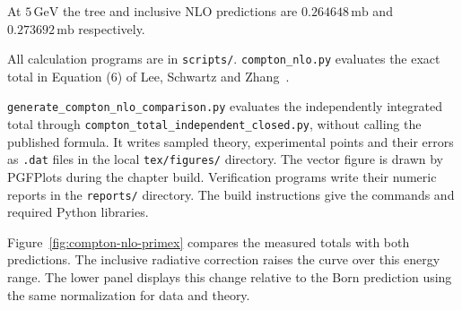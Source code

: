 At $5\,\mathrm{GeV}$ the tree and inclusive NLO predictions are
$0.264648\,\mathrm{mb}$ and $0.273692\,\mathrm{mb}$ respectively.


All calculation programs are in \texttt{scripts/}.
\texttt{compton\_nlo.py} evaluates the exact total in Equation (6)
of Lee, Schwartz and Zhang~\cite{qed-processes-lsz}.

\texttt{generate\_compton\_nlo\_comparison.py} evaluates the independently
integrated total through
\nolinkurl{compton_total_independent_closed.py}, without calling the
published formula. It writes sampled theory,
experimental points and their errors as \texttt{.dat} files in the
local \texttt{tex/figures/} directory. The vector figure is drawn by PGFPlots
during the chapter build. Verification programs write their numeric
reports in the \texttt{reports/} directory. The build instructions give
the commands and required Python libraries.

Figure~\ref{fig:compton-nlo-primex} compares the measured totals with
both predictions. The inclusive radiative correction raises the curve
over this energy range. The lower panel displays this change relative
to the Born prediction using the same normalization for data and theory.





